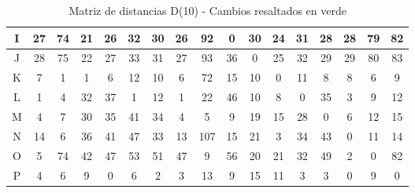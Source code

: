 \documentclass[12pt]{article}
\begin{document}
\begin{table}[h!]
\begin{tabular}{|c|c|c|c|c|c|c|c|c|c|c|c|c|c|c|c|c|}
I & 27 & 74 & 21 & 26 & 32 & 30 & 26 & 92 & 0 & 30 & 24 & 31 & 28 & 28 & 79 & 82 \\\hline
J & 28 & 75 & 22 & 27 & 33 & 31 & 27 & 93 & 36 & 0 & 25 & 32 & 29 & 29 & 80 & 83 \\\hline
K & 7 & 1 & 1 & 6 & 12 & 10 & 6 & 72 & 15 & 10 & 0 & 11 & 8 & 8 & 6 & 9 \\\hline
L & 1 & 4 & \cellcolor{lightgreen} 32 & \cellcolor{lightgreen} 37 & 1 & 12 & 1 & 22 & \cellcolor{lightgreen} 46 & 10 & 8 & 0 & 35 & 3 & 9 & 12 \\\hline
M & 4 & 7 & 30 & 35 & 41 & 34 & 4 & 5 & 9 & 19 & 15 & 28 & 0 & 6 & 12 & 15 \\\hline
N & 14 & 6 & 36 & 41 & 47 & 33 & 13 & 107 & 15 & 21 & 3 & 34 & 43 & 0 & 11 & 14 \\\hline
O & 5 & 74 & \cellcolor{lightgreen} 42 & \cellcolor{lightgreen} 47 & \cellcolor{lightgreen} 53 & \cellcolor{lightgreen} 51 & \cellcolor{lightgreen} 47 & 9 & \cellcolor{lightgreen} 56 & 20 & 21 & 32 & \cellcolor{lightgreen} 49 & 2 & 0 & 82 \\\hline
P & 4 & 6 & 9 & 0 & 6 & 2 & 3 & 13 & 9 & 15 & 11 & 3 & 3 & 0 & 9 & 0 \\\hline
\end{tabular}
\caption{Matriz de distancias D(10) - Cambios resaltados en verde}
\end{table}
\end{document}
